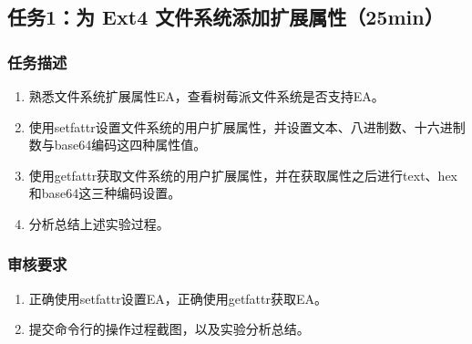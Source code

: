 \documentclass{article}
\begin{document}
\subsection{任务1：为 Ext4 文件系统添加扩展属性（25min）}

\subsubsection{任务描述}
\begin{enumerate}
    \item 熟悉文件系统扩展属性EA，查看树莓派文件系统是否支持EA。
    \item 使用setfattr设置文件系统的用户扩展属性，并设置文本、八进制数、十六进制数与base64编码这四种属性值。
    \item 使用getfattr获取文件系统的用户扩展属性，并在获取属性之后进行text、hex和base64这三种编码设置。
    \item 分析总结上述实验过程。
\end{enumerate}

\subsubsection{审核要求}
\begin{enumerate}
    \item 正确使用setfattr设置EA，正确使用getfattr获取EA。
    \item 提交命令行的操作过程截图，以及实验分析总结。
\end{enumerate}
\end{document}
